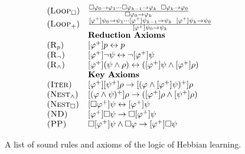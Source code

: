 \documentclass[12pt]{article}
\theoremstyle{definition}
\newcommand{\orr}{\vee}
\newcommand{\axiom}{\textsc}
\begin{document}
\begin{figure}[ht!]
\begin{equation*}
{\begin{array}{ll}
    (\axiom{Loop}_\Box) & 
    \frac{\Box \varphi_0 \to \varphi_1
    \cdots
    \Box \varphi_{k-1} \to \varphi_k \enskip
    \Box \varphi_k \to \varphi_0}
    {\Box \varphi_0 \to \varphi_k} \\
    
    (\axiom{Loop}_+) & \frac{[\varphi^+] \psi_0 \to \psi_1 
    \cdots 
    [\varphi^+] \psi_{k-1} \to \psi_k \enskip 
    [\varphi^+] \psi_k \to \psi_0}
    {[\varphi^+] \psi_0 \to \psi_k} \\
    
    & \textbf{Reduction Axioms}\\

    (\axiom{R}_p) & [\varphi^+] p \leftrightarrow p \\
    
    (\axiom{R}_\neg) & [\varphi^+] \neg \psi \leftrightarrow \neg [\varphi^+] \psi \\
    
    (\axiom{R}_\land) & [\varphi^+] (\psi \land \rho) \leftrightarrow ([\varphi^+] \psi \land [\varphi^+] \rho)\\
    
    & \textbf{Key Axioms}\\
    
    \axiom{(Iter)} & [\varphi^+] [\psi^+] \rho \to [(\varphi \land [\varphi^+] \psi)^+] \rho \quad\\
    
    
    (\axiom{Nest}_\land) & [(\varphi \land \psi)^+] \rho \to ([\varphi^+] \rho \land [\psi^+] \rho)\\
    
    (\axiom{Nest}_\Box) & [\Box \varphi^+] \psi \leftrightarrow [\varphi^+] \psi \\

    \axiom{(ND)} & [\varphi^+] \Box \psi \to \Box [\varphi^+] \psi\\
    
    \axiom{(PP)} & \Box [\varphi^+] \psi \land \Box \varphi \to [\varphi^+] \Box \psi\\
\end{array}
}
\end{equation*}
\caption{A list of sound rules and axioms of the logic of Hebbian learning.}
\label{fig:proof-system}
\end{figure}
\end{document}
